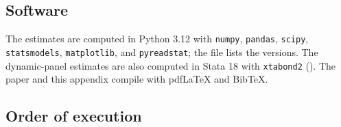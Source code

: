 \subsection{Software}

The estimates are computed in Python 3.12 with \texttt{numpy},
\texttt{pandas}, \texttt{scipy}, \texttt{statsmodels},
\texttt{matplotlib}, and \texttt{pyreadstat}; the file
 lists the versions. The dynamic-panel estimates
are also computed in Stata 18 with \texttt{xtabond2}
(). The paper and this appendix
compile with pdfLaTeX and BibTeX.

\subsection{Order of execution}

